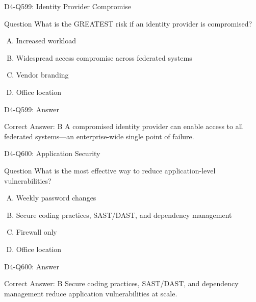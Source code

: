 \documentclass{beamer}
\begin{document}
	\begin{frame}{D4-Q599: Identity Provider Compromise}
		\begin{block}{Question}
			What is the GREATEST risk if an identity provider is compromised?
		\end{block}
		\begin{enumerate}[(A)]
			\item Increased workload
			\item Widespread access compromise across federated systems
			\item Vendor branding
			\item Office location
		\end{enumerate}
	\end{frame}
	\begin{frame}{D4-Q599: Answer}
		\begin{block}{Correct Answer: B}
			A compromised identity provider can enable access to all federated systems—an enterprise-wide single point of failure.
		\end{block}
	\end{frame}
	
	\begin{frame}{D4-Q600: Application Security}
		\begin{block}{Question}
			What is the most effective way to reduce application-level vulnerabilities?
		\end{block}
		\begin{enumerate}[(A)]
			\item Weekly password changes
			\item Secure coding practices, SAST/DAST, and dependency management
			\item Firewall only
			\item Office location
		\end{enumerate}
	\end{frame}
	\begin{frame}{D4-Q600: Answer}
		\begin{block}{Correct Answer: B}
			Secure coding practices, SAST/DAST, and dependency management reduce application vulnerabilities at scale.
		\end{block}
	\end{frame}
	
\end{document}
